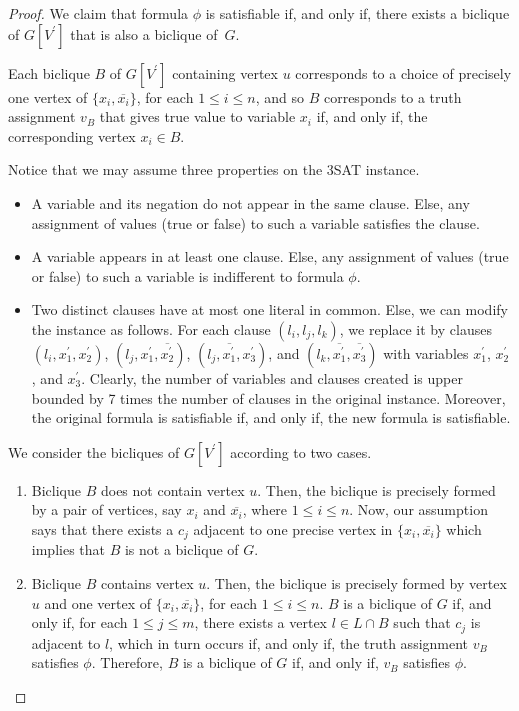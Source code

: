 \documentclass{article}
\begin{document}
\begin{proof}
	We claim that formula $\phi$ is satisfiable if, and only if, there exists a
	biclique of $G[V^\prime]$ that is also a biclique of~$G$.
	
	Each biclique $B$ of $G[V^\prime]$ containing vertex $u$ corresponds to a
	choice of precisely one vertex of $\{x_i, \overline{x_i}\}$, for each $1
	\leq i \leq n$, and so $B$ corresponds to a truth assignment $v_{B}$ that gives
	true value to variable $x_i$ if, and only if, the corresponding vertex $x_i
	\in B$.
	
	Notice that we may assume three properties on the {\sc 3SAT} instance.
	
	\begin{itemize}
	  \item A variable and its negation do not appear in the same clause. Else,
	  any assignment of values (true or false) to such a variable satisfies the
	  clause.
	  \item A variable appears in at least one clause. Else,
	  any assignment of values (true or false) to such a variable is
	  indifferent to formula $\phi$.
	  \item Two distinct clauses have at most one literal in common. 
	  Else, we can modify the instance as follows. For each clause 
	  $(l_i, l_j, l_k)$, we replace it by clauses $(l_i, x^\prime_1, x^\prime_2)$, 
	  $(l_j, x^\prime_1, \overline{x^\prime_2})$, $(l_j, \overline{x^\prime_1}, x^\prime_3)$,
	  and $(l_k, \overline{x^\prime_1}, \overline{x^\prime_3})$ with variables $x^\prime_1$,
	  $x^\prime_2$, and $x^\prime_3$. Clearly, the number of variables and clauses created is upper
	  bounded by 7 times the number of clauses in the original instance. 
	  Moreover, the original formula is satisfiable if, and only if, the new
	  formula is satisfiable. 
	\end{itemize}    
 
	We consider the bicliques of $G[V^\prime]$ according to two cases.
	\begin{enumerate}
		\item Biclique $B$ does not contain vertex $u$. Then, the biclique is
		precisely formed by a pair of vertices, say $x_i$ and $\overline{x_i}$,
		where $1 \leq i \leq n$. Now, our assumption says that there exists a $c_j$
		adjacent to one precise vertex in $\{x_i, \overline{x_i}\}$ which implies
		that $B$ is not a biclique of $G$.
		\item Biclique $B$ contains vertex $u$. Then, the biclique is
		precisely formed by vertex $u$ and one vertex of $\{x_{i},
		\overline{x_{i}}\}$, for each $1 \leq i \leq n$. $B$ is a biclique of $G$ if, and only if, for each
		$1 \leq j \leq m$, there exists a vertex $l \in L \cap B$ such that $c_j$ is
		adjacent to $l$, which in turn occurs if, and only if, the truth assignment
		$v_B$ satisfies $\phi$. Therefore, $B$ is a biclique of $G$ if, and only if,
		$v_B$ satisfies $\phi$.
	\end{enumerate}
	

\end{proof}
\end{document}
